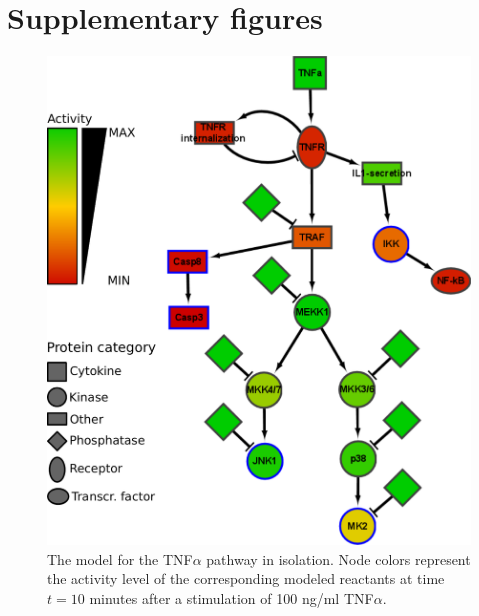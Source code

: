 



\clearpage

\section{Supplementary figures}\label{sec:supplementary-figures}


\begin{figure}[htpb]
\begin{minipage}{\textwidth}
\centering
  \includegraphics[width=.7\textwidth]{images/large_network_tnfa2}
\caption{The model for the TNF$\alpha$ pathway in isolation. Node colors represent the activity level of the
corresponding modeled reactants at time $t = 10$ minutes after a stimulation of 100 ng/ml TNF$\alpha$.}\label{fig:large-model-tnf}
\end{minipage}
\end{figure}

